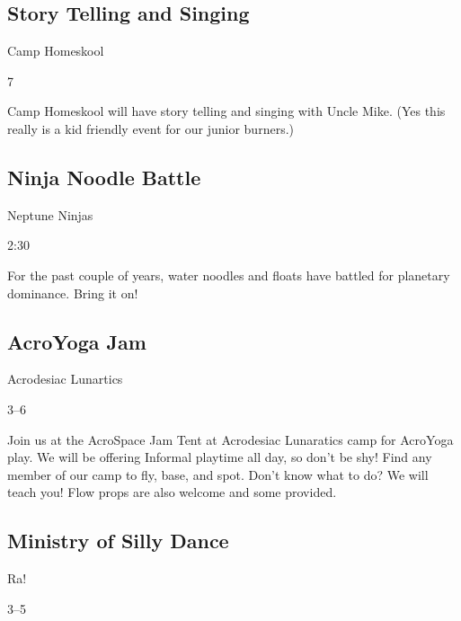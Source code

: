 \begin{multicols}{2}
\subsection*{Story Telling and Singing}
\begin{description}[leftmargin=6em,noitemsep,style=nextline]
	\item[Camp:] Camp Homeskool
  \item[Times:] 7\pm
\end{description}

Camp Homeskool will have story telling and singing with Uncle Mike. (Yes this really is a kid friendly event for our junior burners.)   

\subsection*{Ninja Noodle Battle}
\begin{description}[leftmargin=6em,noitemsep,style=nextline]
	\item[Camp:] Neptune Ninjas
  \item[Times:] 2:30\pm
\end{description}

For the past couple of years, water noodles and floats have battled for planetary dominance. Bring it on!

\columnbreak
\subsection*{AcroYoga Jam}
\begin{description}[leftmargin=6em,noitemsep,style=nextline]
	\item[Camp:] Acrodesiac Lunartics
  \item[Times:] 3--6\pm
\end{description}

Join us at the AcroSpace Jam Tent at Acrodesiac Lunaratics camp for AcroYoga play. We will be offering Informal playtime all day, so don't be shy! Find any member of our camp to fly, base, and spot. Don't know what to do? We will teach you! Flow props are also  welcome and some provided.

\subsection*{Ministry of Silly Dance}
\begin{description}[leftmargin=6em,noitemsep,style=nextline]
	\item[Camp:] Ra!
    \item[Times:] 3--5\pm
\end{description}


\end{multicols}
